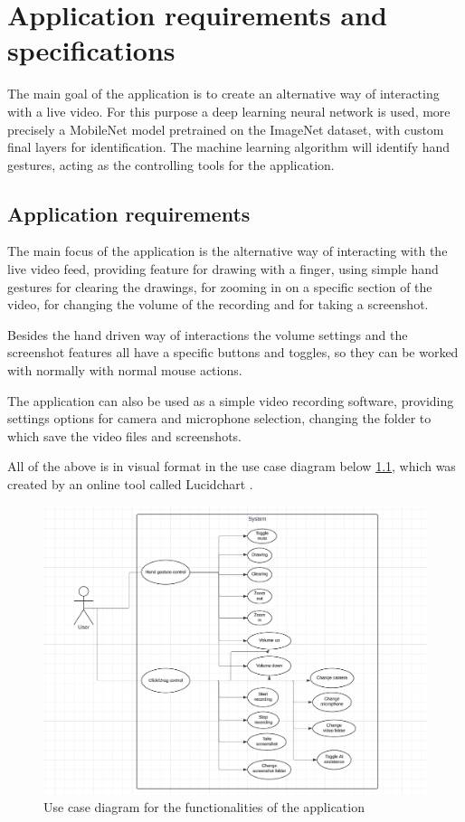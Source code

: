 \chapter{Application requirements and specifications}
\label{chap:specs}

\par The main goal of the application is to create an alternative way of interacting with a live video. For this purpose a deep learning neural network is used, more precisely a MobileNet model pretrained on the ImageNet dataset, with custom final layers for identification. The machine learning algorithm will identify hand gestures, acting as the controlling tools for the application. 

\section{Application requirements}
\label{sec:specssec1}

\par The main focus of the application is the alternative way of interacting with the live video feed, providing feature for drawing with a finger, using simple hand gestures for clearing the drawings, for zooming in on a specific section of the video, for changing the volume of the recording and for taking a screenshot.
\par Besides the hand driven way of interactions the volume settings and the screenshot features all have a specific buttons and toggles, so they can be worked with normally with normal mouse actions.
\par The application can also be used as a simple video recording software, providing settings options for camera and microphone selection, changing the folder to which save the video files and screenshots.
\par All of the above is in visual format in the use case diagram below \ref{fig:usecase}, which was created by an online tool called Lucidchart \cite{lucidchart}.

\begin{figure}
    \centering
    \includegraphics[width=0.8\linewidth]{figures/UseCaseDiagram.png}
    \caption{Use case diagram for the functionalities of the application}
    \label{fig:usecase}
\end{figure}

